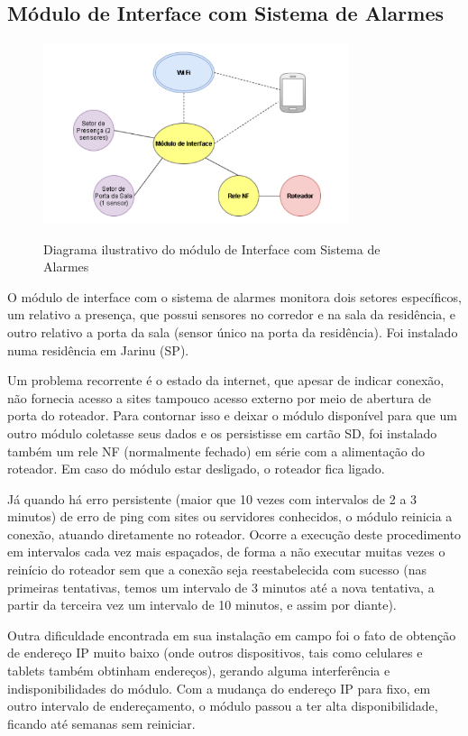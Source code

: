 \subsection{Módulo de Interface com Sistema de Alarmes}

\begin{figure}[H]
	\centering
	\caption{Diagrama ilustrativo do módulo de Interface com Sistema de Alarmes}
	\includegraphics[width=0.8\textwidth]{diagramaAlarme}
	\label{fig:diagramaAlarme}
\end{figure}


O módulo de interface com o sistema de alarmes monitora dois setores específicos, um relativo a presença, que possui sensores no corredor e na sala da residência, e outro relativo a porta da sala (sensor único na porta da residência). Foi instalado numa residência em Jarinu (SP).

Um problema recorrente é o estado da internet, que apesar de indicar conexão, não fornecia acesso a sites tampouco acesso externo por meio de abertura de porta do roteador. Para contornar isso e deixar o módulo disponível para que um outro módulo coletasse seus dados e os persistisse em cartão SD, foi instalado também um rele NF (normalmente fechado) em série com a alimentação do roteador. Em caso do módulo estar desligado, o roteador fica ligado.

Já quando há erro persistente (maior que 10 vezes com intervalos de 2 a 3 minutos) de erro de ping com sites ou servidores conhecidos, o módulo reinicia a conexão, atuando diretamente no roteador. Ocorre a execução deste procedimento em intervalos cada vez mais espaçados, de forma a não executar muitas vezes o reinício do roteador sem que a conexão seja reestabelecida com sucesso (nas primeiras tentativas, temos um intervalo de 3 minutos até a nova tentativa, a partir da terceira vez um intervalo de 10 minutos, e assim por diante).

Outra dificuldade encontrada em sua instalação em campo foi o fato de obtenção de endereço IP muito baixo (onde outros dispositivos, tais como celulares e tablets também obtinham endereços), gerando alguma interferência e indisponibilidades do módulo. Com a mudança do endereço IP para fixo, em outro intervalo de endereçamento, o módulo passou a ter alta disponibilidade, ficando até semanas sem reiniciar.
